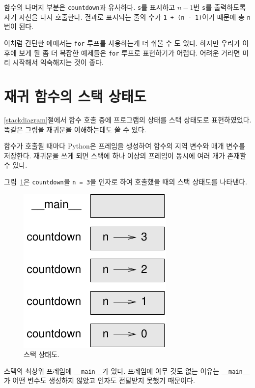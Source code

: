 \documentclass[10pt]{book}
\begin{document}
함수의 나머지 부분은 {\tt countdown}과 유사하다.  {\tt s}를 표시하고
$n-1$번 {\tt s}를 출력하도록 자기 자신을 다시 호출한다.  결과로
표시되는 줄의 수가 {\tt 1 + (n - 1)}이기 때문에 총 {\tt n}번이 된다.


이처럼 간단한 예에서는 {\tt for} 루프를 사용하는게 더 쉬울 수 도 있다.
하지만 우리가 이후에 보게 될 좀 더 복잡한 예제들은 {\tt for} 루프로
표현하기가 어렵다.  어려운 거라면 미리 시작해서 익숙해지는 것이 좋다.


\section{재귀 함수의 스택 상태도}
\label{recursive.stack}

\ref{stackdiagram}절에서 함수 호출 중에 프로그램의 상태를 스택 상태도로
표현하였었다.  똑같은 그림을 재귀문을 이해하는데도 쓸 수 있다.

함수가 호출될 때마다 Python은 프레임을 생성하여 함수의 지역 변수와 매개
변수를 저장한다.  재귀문을 쓰게 되면 스택에 하나 이상의 프레임이
동시에 여러 개가 존재할 수 있다.

그림~\ref{fig.stack2}은 {\tt countdown}을 {\tt n = 3}을 인자로 하여
호출했을 때의 스택 상태도를 나타낸다.

\begin{figure}
\centerline
{\includegraphics[scale=0.8]{figs/stack2.pdf}}
\caption{스택 상태도.}
\label{fig.stack2}
\end{figure}

스택의 최상위 프레임에 \verb"__main__"가 있다.  프레임에 아무 것도 없는
이유는 \verb"__main__"가 어떤 변수도 생성하지 않았고 인자도 전달받지
못했기 때문이다.
\end{document}
